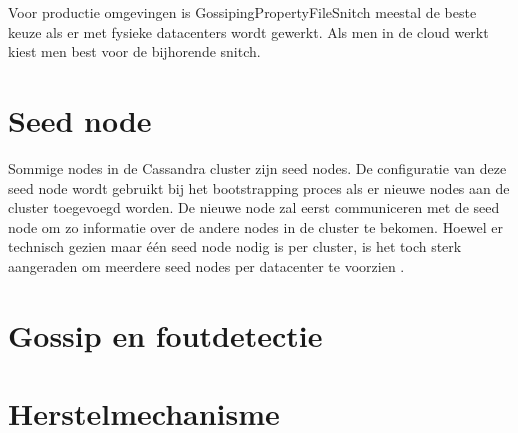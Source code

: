 Voor productie omgevingen is GossipingPropertyFileSnitch meestal de beste keuze als er met fysieke datacenters wordt gewerkt.
Als men in de cloud werkt kiest men best voor de bijhorende snitch.

\section{Seed node}
Sommige nodes in de Cassandra cluster zijn seed nodes.
De configuratie van deze seed node wordt gebruikt bij het bootstrapping proces als er nieuwe nodes aan de cluster toegevoegd worden.
De nieuwe node zal eerst communiceren met de seed node om zo informatie over de andere nodes in de cluster te bekomen.
Hoewel er technisch gezien maar één seed node nodig is per cluster, is het toch sterk aangeraden om meerdere seed nodes per datacenter te voorzien \citep{kan2014cassandra}.

\section{Gossip en foutdetectie}
\section{Herstelmechanisme}
